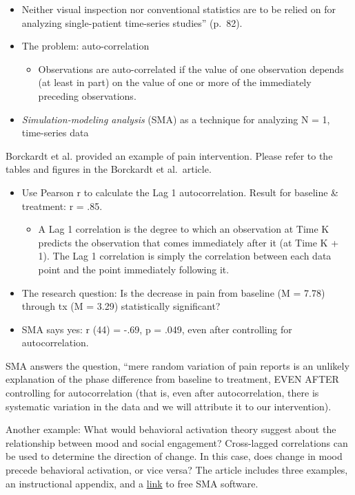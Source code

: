 \documentclass[
  english,
]{book}
\providecommand{\tightlist}{%
  \setlength{\itemsep}{0pt}\setlength{\parskip}{0pt}}
\begin{document}
\begin{itemize}
\tightlist
\item
  Neither visual inspection nor conventional statistics are to be relied on for analyzing single-patient time-series studies'' (p.~82).
\item
  The problem: auto-correlation

  \begin{itemize}
  \tightlist
  \item
    Observations are auto-correlated if the value of one observation depends (at least in part) on the value of one or more of the immediately preceding observations.
  \end{itemize}
\item
  \emph{Simulation-modeling analysis} (SMA) as a technique for analyzing N = 1, time-series data
\end{itemize}

Borckardt et al. \citeyearpar{borckardt_clinical_2008} provided an example of pain intervention. Please refer to the tables and figures in the Borckardt et al.~article.

\begin{itemize}
\tightlist
\item
  Use Pearson r to calculate the Lag 1 autocorrelation. Result for baseline \& treatment: r = .85.

  \begin{itemize}
  \tightlist
  \item
    A Lag 1 correlation is the degree to which an observation at Time K predicts the observation that comes immediately after it (at Time K + 1). The Lag 1 correlation is simply the correlation between each data point and the point immediately following it.
  \end{itemize}
\item
  The research question: Is the decrease in pain from baseline (M = 7.78) through tx (M = 3.29) statistically significant?
\item
  SMA says yes: r (44) = -.69, p = .049, even after controlling for autocorrelation.
\end{itemize}

SMA answers the question, ``mere random variation of pain reports is an unlikely explanation of the phase difference from baseline to treatment, EVEN AFTER controlling for autocorrelation (that is, even after autocorrelation, there is systematic variation in the data and we will attribute it to our intervention).

Another example: What would behavioral activation theory suggest about the relationship between mood and social engagement? Cross-lagged correlations can be used to determine the direction of change. In this case, does change in mood precede behavioral activation, or vice versa? The article includes three examples, an instructional appendix, and a \href{http://clinicalresearcher.org}{link} to free SMA software.
\end{document}
